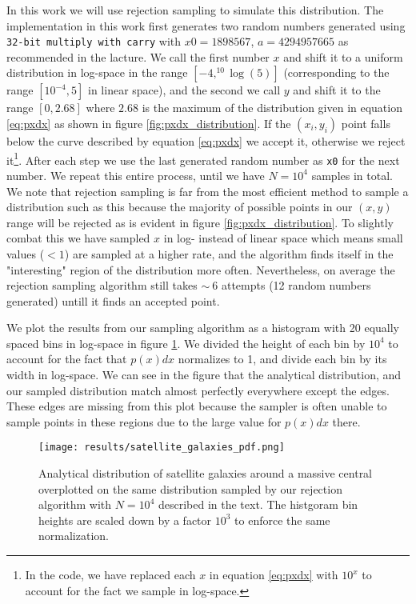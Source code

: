 In this work we will use rejection sampling to simulate this distribution. The implementation in this work first generates two random numbers generated using \texttt{32-bit multiply with carry} with $x0=1898567$, $a=4294957665$ as recommended in the lacture. We call the first number $x$ and shift it to a uniform distribution in log-space in the range $\left[-4, ^{10}\log(5)\right]$ (corresponding to the range $\left[10^{-4}, 5\right]$ in linear space), and the second we call $y$ and shift it to the range $\left[0, 2.68\right]$ where $2.68$ is the maximum of the distribution given in equation \ref{eq:pxdx} as shown in figure \ref{fig:pxdx_distribution}. If the $\left(x_i, y_i\right)$ point falls below the curve described by equation \ref{eq:pxdx} we accept it, otherwise we reject it\footnote{In the code, we have replaced each $x$ in equation \ref{eq:pxdx} with $10^x$ to account for the fact we sample in log-space.}. After each step we use the last generated random number as \texttt{x0} for the next number. We repeat this entire process, until we have $N = 10^4$ samples in total. We note that rejection sampling is far from the most efficient method to sample a distribution such as this because the majority of possible points in our $\left(x, y\right)$ range will be rejected as is evident in figure \ref{fig:pxdx_distribution}. To slightly combat this we have sampled $x$ in log- instead of linear space which means small values ($<1$) are sampled at a higher rate, and the algorithm finds itself in the "interesting" region of the distribution more often. Nevertheless, on average the rejection sampling algorithm still takes $\sim~6$ attempts (12 random numbers generated) untill it finds an accepted point.

We plot the results from our sampling algorithm as a histogram with 20 equally spaced bins in log-space in figure \ref{fig:gal_pdf}. We divided the height of each bin by $10^4$ to account for the fact that $p(x)dx$ normalizes to 1, and divide each bin by its width in log-space. We can see in the figure that the analytical distribution, and our sampled distribution match almost perfectly everywhere except the edges. These edges are missing from this plot because the sampler is often unable to sample points in these regions due to the large value for $p(x)dx$ there.

\begin{figure}
    \centering
    \texttt{[image: results/satellite\_galaxies\_pdf.png]}
    \caption{Analytical distribution of satellite galaxies around a massive central overplotted on the same distribution sampled by our rejection algorithm with $N=10^4$ described in the text. The histgoram bin heights are scaled down by a factor $10^3$ to enforce the same normalization.}
    \label{fig:gal_pdf}
\end{figure}

